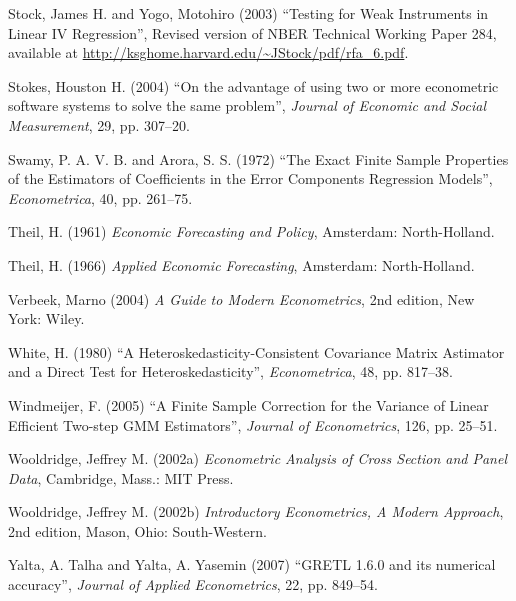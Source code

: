 \begin{thebibliography}
  Stock, James H. and Yogo, Motohiro (2003) ``Testing for Weak
  Instruments in Linear IV Regression'', Revised version of 
  NBER Technical Working Paper 284, available at
  \url{http://ksghome.harvard.edu/~JStock/pdf/rfa_6.pdf}.

  Stokes, Houston H. (2004) ``On the advantage of using two or more
  econometric software systems to solve the same problem'',
  \emph{Journal of Economic and Social Measurement}, 29, pp. 307--20.

  Swamy, P. A. V. B. and Arora, S. S. (1972) ``The Exact Finite Sample
  Properties of the Estimators of Coefficients in the Error Components
  Regression Models'', \emph{Econometrica}, 40, pp. 261--75.  

  Theil, H. (1961) \emph{Economic Forecasting and Policy}, Amsterdam:
  North-Holland.

  Theil, H. (1966) \emph{Applied Economic Forecasting}, Amsterdam:
  North-Holland.

  Verbeek, Marno (2004) \emph{A Guide to Modern Econometrics}, 2nd
  edition, New York: Wiley.

  White, H. (1980) ``A Heteroskedasticity-Consistent Covariance Matrix
  Astimator and a Direct Test for Heteroskedasticity'',
  \emph{Econometrica}, 48, pp. 817--38.

  Windmeijer, F. (2005) ``A Finite Sample Correction for the Variance
  of Linear Efficient Two-step GMM Estimators'', \emph{Journal of
    Econometrics}, 126, pp. 25--51.
  
  Wooldridge, Jeffrey M. (2002a) \emph{Econometric Analysis of Cross
    Section and Panel Data}, Cambridge, Mass.: MIT Press.

  Wooldridge, Jeffrey M. (2002b) \emph{Introductory Econometrics, A
    Modern Approach}, 2nd edition, Mason, Ohio: South-Western.

  Yalta, A. Talha and Yalta, A. Yasemin (2007) ``GRETL 1.6.0 and its
  numerical accuracy'', \emph{Journal of Applied Econometrics}, 22,
  pp. 849--54.

\end{thebibliography}


